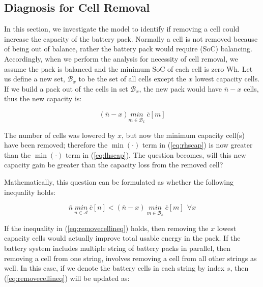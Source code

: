 \documentclass[10pt,twocolumn]{IEEEtran}
\begin{document}
\subsection{Diagnosis for Cell Removal }
In this section, we investigate the model to identify if removing a cell could increase the capacity of the battery pack.
Normally  a cell is not removed because of being out of balance,  rather the battery  pack would require (SoC) balancing.
Accordingly,  when we perform the  analysis for necessity of cell removal, we assume the pack is balanced and the minimum SoC of each cell is zero Wh.
Let us define a new set, $\mathcal{B}_x$ to be the set of all cells except the $x$ lowest capacity cells.
If we build a pack out of the cells in set $\mathcal{B}_x$, the new pack would have $\overline{n} - x$ cells, thus the new capacity is:

\begin{equation}
(\overline{n}-x) \underset{m\in \mathcal{B}_x}{min} \ \overline c[m]
\label{eq:rhscap}
\end{equation}

The number of cells was lowered by $x$, but now the minimum capacity cell(s) have been removed; therefore the $\min(\cdot)$ term in (\ref{eq:rhscap}) is now greater than the $\min(\cdot)$ term in (\ref{eq:lhscap}). The question becomes, will this new capacity gain be greater than the capacity loss from the removed cell?

Mathematically, this question can be formulated as whether the following inequality holds:

\begin{equation}
\overline{n} \  \underset{n\in \mathcal{A}}{min} \ \overline c[n] < (\overline{n}-x) \ \underset{m\in \mathcal{B}_x}{min} \ \overline c[m] \ \  \forall x
\label{eq:removecellineq}
\end{equation}

If the inequality in (\ref{eq:removecellineq}) holds, then removing the $x$ lowest capacity cells would actually improve total usable energy in the pack. 
If the battery system includes multiple string of battery packs in parallel, then removing a cell from one string, involves removing a cell from all other strings as well.
In this case, if we denote the battery cells in each string by index $s$,  then (\ref{eq:removecellineq}) will be updated  as:
\end{document}

